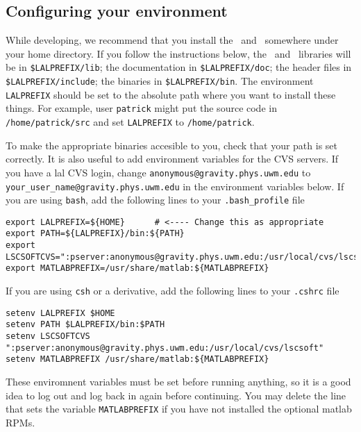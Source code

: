 \color{black}
\subsection{Configuring your environment}\label{ss:config}
\color{black}

While developing,  we recommend that you install the \lal\ and \lalapps\
somewhere under your home directory.  If you follow the
instructions below,  the \lal\ and \lalapps\ libraries will be in
\verb+$LALPREFIX/lib+;  the documentation in \verb+$LALPREFIX/doc+; the header
files in \verb+$LALPREFIX/include+; the binaries in \verb+$LALPREFIX/bin+.
The environment \verb+LALPREFIX+ should be set to the absolute path where you
want to install these things.  For example,  user \texttt{patrick} might put
the source code in \verb+/home/patrick/src+ and set \verb+LALPREFIX+ to
\verb+/home/patrick+.

To make the appropriate binaries accesible to you,  check that your path is
set correctly. It is also useful to add environment variables for the CVS
servers. If you have a lal CVS login, change
\verb+anonymous@gravity.phys.uwm.edu+ to
\verb+your_user_name@gravity.phys.uwm.edu+ in the environment variables below.
If you are using \texttt{bash}, add
the following lines to your \texttt{.bash\_profile} file
\begin{verbatim}
export LALPREFIX=${HOME}      # <---- Change this as appropriate
export PATH=${LALPREFIX}/bin:${PATH}
export LSCSOFTCVS=":pserver:anonymous@gravity.phys.uwm.edu:/usr/local/cvs/lscsoft"
export MATLABPREFIX=/usr/share/matlab:${MATLABPREFIX}
\end{verbatim}
If you are using \texttt{csh} or a derivative,  add the following lines to
your \texttt{.cshrc} file
\begin{verbatim}
setenv LALPREFIX $HOME
setenv PATH $LALPREFIX/bin:$PATH
setenv LSCSOFTCVS ":pserver:anonymous@gravity.phys.uwm.edu:/usr/local/cvs/lscsoft"
setenv MATLABPREFIX /usr/share/matlab:${MATLABPREFIX}
\end{verbatim}
These enviromnent variables must be set before running anything,
so it is a good idea to log out and log back in again before
continuing. You may delete the line that sets the variable 
\texttt{MATLABPREFIX} if you have not installed the optional matlab RPMs.

\color{black}
